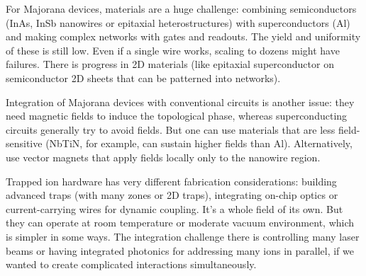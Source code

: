 \documentclass[11pt]{article}
\begin{document}
For Majorana devices, materials are a huge challenge: combining semiconductors (InAs, InSb nanowires or epitaxial heterostructures) with superconductors (Al) and making complex networks with gates and readouts. The yield and uniformity of these is still low. Even if a single wire works, scaling to dozens might have failures. There is progress in 2D materials (like epitaxial superconductor on semiconductor 2D sheets that can be patterned into networks).

Integration of Majorana devices with conventional circuits is another issue: they need magnetic fields to induce the topological phase, whereas superconducting circuits generally try to avoid fields. But one can use materials that are less field-sensitive (NbTiN, for example, can sustain higher fields than Al). Alternatively, use vector magnets that apply fields locally only to the nanowire region.

Trapped ion hardware has very different fabrication considerations: building advanced traps (with many zones or 2D traps), integrating on-chip optics or current-carrying wires for dynamic coupling. It's a whole field of its own. But they can operate at room temperature or moderate vacuum environment, which is simpler in some ways. The integration challenge there is controlling many laser beams or having integrated photonics for addressing many ions in parallel, if we wanted to create complicated interactions simultaneously.
\end{document}

